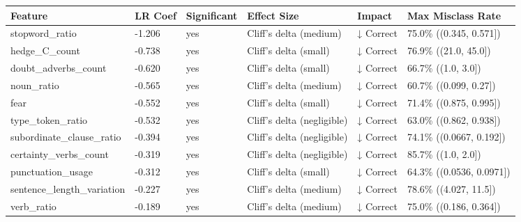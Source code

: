 \begin{tabular}{llllll}
\toprule
Feature & LR Coef & Significant & Effect Size & Impact & Max Misclass Rate \\
\midrule
stopword\_ratio & -1.206 & yes & Cliff's delta (medium) & ↓ Correct & 75.0\% ((0.345, 0.571]) \\
hedge\_C\_count & -0.738 & yes & Cliff's delta (small) & ↓ Correct & 76.9\% ((21.0, 45.0]) \\
doubt\_adverbs\_count & -0.620 & yes & Cliff's delta (small) & ↓ Correct & 66.7\% ((1.0, 3.0]) \\
noun\_ratio & -0.565 & yes & Cliff's delta (medium) & ↓ Correct & 60.7\% ((0.099, 0.27]) \\
fear & -0.552 & yes & Cliff's delta (small) & ↓ Correct & 71.4\% ((0.875, 0.995]) \\
type\_token\_ratio & -0.532 & yes & Cliff's delta (negligible) & ↓ Correct & 63.0\% ((0.862, 0.938]) \\
subordinate\_clause\_ratio & -0.394 & yes & Cliff's delta (negligible) & ↓ Correct & 74.1\% ((0.0667, 0.192]) \\
certainty\_verbs\_count & -0.319 & yes & Cliff's delta (negligible) & ↓ Correct & 85.7\% ((1.0, 2.0]) \\
punctuation\_usage & -0.312 & yes & Cliff's delta (small) & ↓ Correct & 64.3\% ((0.0536, 0.0971]) \\
sentence\_length\_variation & -0.227 & yes & Cliff's delta (medium) & ↓ Correct & 78.6\% ((4.027, 11.5]) \\
verb\_ratio & -0.189 & yes & Cliff's delta (medium) & ↓ Correct & 75.0\% ((0.186, 0.364]) \\
\bottomrule
\end{tabular}
